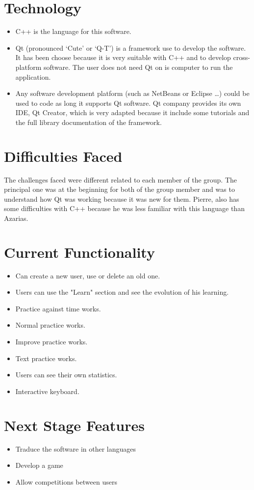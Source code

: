 \section{Technology}
\begin{itemize}
    \item C++ is the language for this software.
    \item Qt (pronounced ‘Cute’ or ‘Q-T’) is a framework use to develop the software. It has been choose because it is very suitable with C++ and to develop cross-platform software. The user does not need Qt on is computer to run the application. 
    \item Any software development platform (such as NetBeans or Eclipse …) could be used to code as long it supports Qt software. Qt company provides its own IDE, Qt Creator, which is very adapted because it include some tutorials and the full library documentation of the framework. 
\end{itemize}

\section{Difficulties Faced}
The challenges faced were different related to each member of the group. The principal one was at the beginning for both of the group member and was to understand how Qt was working because it was new for them. Pierre, also has some difficulties with C++ because he was less familiar with this language than Azarias. 

\section{Current Functionality}
\begin{itemize}
\item Can create a new user, use or delete an old one.
\item Users can use the "Learn" section and see the evolution of his learning.
\item Practice against time works.
\item Normal practice works.
\item Improve practice works.
\item Text practice works.
\item Users can see their own statistics.
\item Interactive keyboard.
\end{itemize}

\section{Next Stage Features}
\begin{itemize}
\item Traduce the software in other languages
\item Develop a game
\item Allow competitions between users
\end{itemize}

